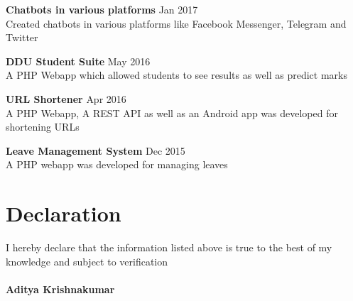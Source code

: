 \documentclass[margin,line]{res}
\begin{document}
\begin{resume}
{\bf Chatbots in various platforms} \hfill{Jan 2017}\\
Created chatbots in various platforms like Facebook Messenger, Telegram and Twitter\vspace{0.02mm}

{\bf DDU Student Suite} \hfill{May 2016}\\
A PHP Webapp which allowed students to see results as well as predict marks\vspace{0.02mm}

{\bf URL Shortener} \hfill{Apr 2016}\\
A PHP Webapp, A REST API as well as an Android app was developed for shortening URLs\vspace{0.02mm}

{\bf Leave Management System} \hfill{Dec 2015}\\
A PHP webapp was developed for managing leaves\vspace{0.02mm}

\section{\sc Declaration }
I hereby declare that the information listed above is true to the best of my knowledge and subject to verification \\
\\{\bf Aditya Krishnakumar} 

\end{resume}
\end{document}
